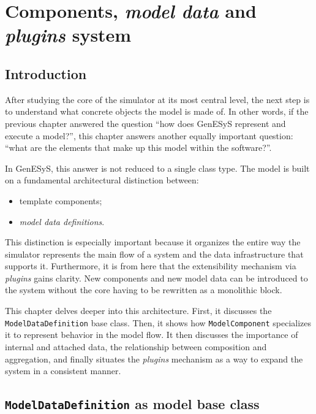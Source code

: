\chapter{Components, \textit{model data} and \textit{plugins} system}
\label{chap:componentes_model_data_plugins}

\section{Introduction}
\label{sec:cap8_introducao}

After studying the core of the simulator at its most central level, the next step is to understand what concrete objects the model is made of. In other words, if the previous chapter answered the question ``how does GenESyS represent and execute a model?'', this chapter answers another equally important question: ``what are the elements that make up this model within the software?''.

In GenESyS, this answer is not reduced to a single class type. The model is built on a fundamental architectural distinction between:
\begin{itemize}
 \item template components;
 \item \textit{model data definitions}.
\end{itemize}

This distinction is especially important because it organizes the entire way the simulator represents the main flow of a system and the data infrastructure that supports it. Furthermore, it is from here that the extensibility mechanism via \textit{plugins} gains clarity. New components and new model data can be introduced to the system without the core having to be rewritten as a monolithic block.

This chapter delves deeper into this architecture. First, it discusses the \texttt{ModelDataDefinition} base class. Then, it shows how \texttt{ModelComponent} specializes it to represent behavior in the model flow. It then discusses the importance of internal and attached data, the relationship between composition and aggregation, and finally situates the \textit{plugins} mechanism as a way to expand the system in a consistent manner.

\section{\texttt{ModelDataDefinition} as model base class}
\label{sec:cap8_modeldatadefinition}

